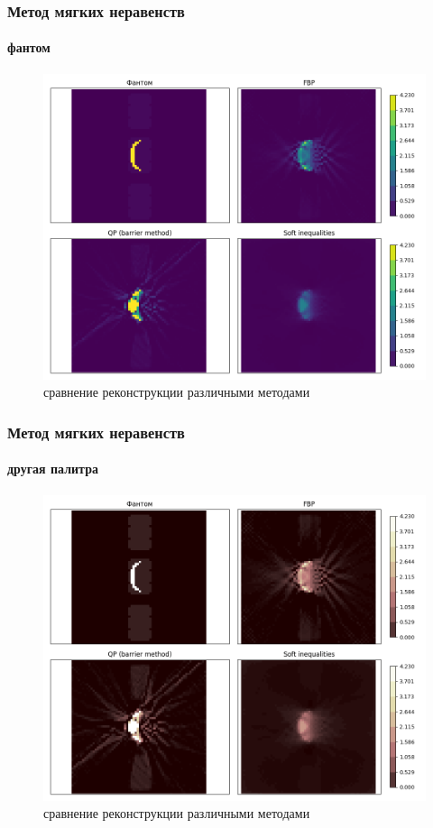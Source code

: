 \documentclass[12pt]{beamer}
\begin{document}
\begin{frame}
\frametitle{Метод мягких неравенств}
\framesubtitle{фантом}

\begin{figure}
  \centering
  \vspace{-0.3cm}
  \includegraphics[height=0.7\textheight]{qp_foursome}
  \caption{сравнение реконструкции различными методами}
  \label{fig:sample}
\end{figure}

\end{frame}


\begin{frame}
\frametitle{Метод мягких неравенств}
\framesubtitle{другая палитра}

\begin{figure}
  \centering
  \vspace{-0.3cm}
  \includegraphics[height=0.7\textheight]{qp_foursome_pink}
  \caption{сравнение реконструкции различными методами}
  \label{fig:sample}
\end{figure}

\end{frame}
\end{document}
